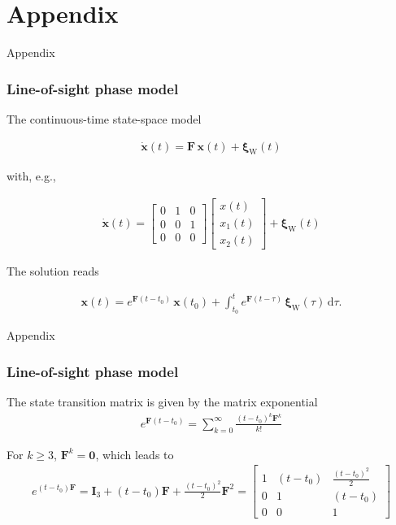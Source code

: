 \documentclass[
    hyperref={colorlinks,citecolor=DeepPink4,linkcolor=DarkRed,urlcolor=DarkBlue}
]{beamer_class}
\begin{document}
\section{Appendix}
\begin{frame}[t]{Appendix}
    \frametitle{Line-of-sight phase model}
    The continuous-time state-space model

    \begin{align}
        \dot{\mathbf{x}}(t) = \mathbf{F}\,\mathbf{x}(t) + \boldsymbol{\xi}_{\mathrm{W}}(t)
    \end{align}

    with, e.g.,

    \begin{align}
        \dot{\mathbf{x}}(t) = \begin{bmatrix} 0 & 1 & 0 \\
        0 & 0 & 1 \\
        0 & 0 & 0 \end{bmatrix} \begin{bmatrix} x(t) \\
        x_{1}(t) \\
        x_{2}(t) \end{bmatrix} + \boldsymbol{\xi}_{\mathrm{W}}(t)
    \end{align}

    The solution reads

    \begin{align}
        \mathbf{x}(t) = e^{\mathbf{F}(t-t_{0})}\,\mathbf{x}(t_{0}) + \int_{t_{0}}^{t} e^{\mathbf{F}(t-\tau)}\,\boldsymbol{\xi}_{\mathrm{W}}(\tau)\,\mathrm{d}\tau.
    \end{align}
\end{frame}

\begin{frame}[t]{Appendix}
    \frametitle{Line-of-sight phase model}
    The state transition matrix is given by the matrix exponential
    \begin{align}
        e^{\mathbf{F}(t - t_0)} = \sum_{k=0}^{\infty} \frac{(t - t_0)^{k} \mathbf{F}^{k}}{k!}
    \end{align}

    For \(k \geq 3\), \(\mathbf{F}^{k} = \mathbf{0}\), which leads to
    \begin{align}
        e^{(t - t_0) \mathbf{F}} = \mathbf{I}_3 + (t - t_0) \mathbf{F} + \frac{(t - t_0)^{2}}{2} \mathbf{F}^{2} =
        \begin{bmatrix}
        1 & (t - t_0) & \frac{(t - t_0)^{2}}{2} \\
        0 & 1 & (t - t_0) \\
        0 & 0 & 1
        \end{bmatrix}
    \end{align}
\end{frame}
\end{document}
